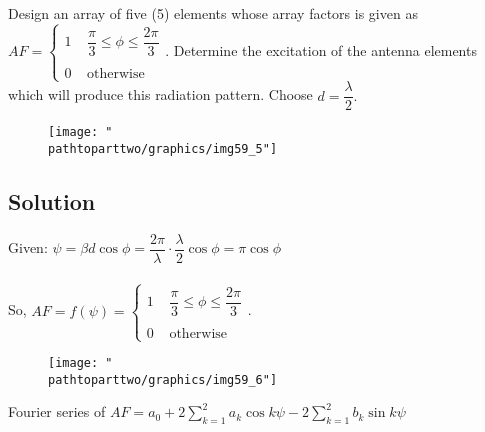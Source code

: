 \begin{exmp}
Design an array of five (5) elements whose array factors is given as\\
$ AF = \begin{cases}
1 \; \; \; \; \dfrac{\pi}{3} \leq \phi \leq \dfrac{2\pi}{3}\\
\\
0 \; \; \; \; \text{otherwise}
\end{cases}$.
Determine the excitation of the antenna elements which will produce this radiation pattern. Choose $d = \dfrac{\lambda}{2}.$
\begin{figure}[h]
\centering
\texttt{[image: "\\pathtoparttwo/graphics/img59\_5"]}
\label{fig:fig-5}
\end{figure}

\subsection{\centering Solution}
Given: $\psi = \beta d \cos\phi = \dfrac{2\pi}{\lambda} \cdot \dfrac{\lambda}{2} \cos\phi = \pi\cos\phi$\\
\\
So, $AF = f(\psi) =\begin{cases}
1 \; \; \; \; \dfrac{\pi}{3} \leq \phi \leq \dfrac{2\pi}{3}\\
\\
0 \; \; \; \; \text{otherwise}
\end{cases}$. 
\begin{figure}[h]
\centering
\texttt{[image: "\\pathtoparttwo/graphics/img59\_6"]}
\label{fig:fig-6}
\end{figure}

Fourier series of $AF =
a_0 + 2 \sum_{k = 1}^{2}a_k\cos k\psi - 2 \sum_{k = 1}^{2}b_k\sin k\psi
\label{sum}
$


\end{exmp}
